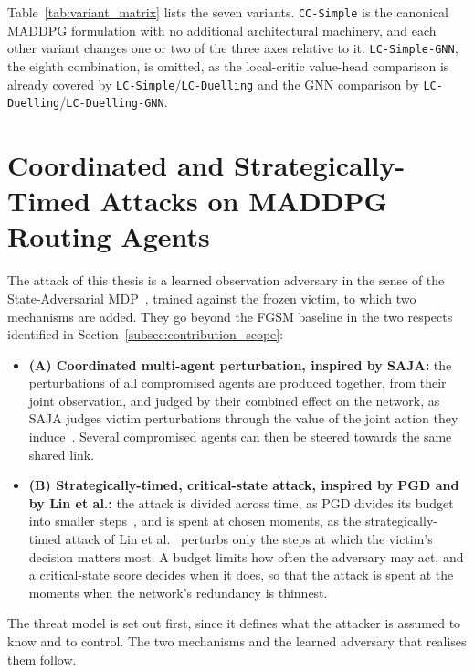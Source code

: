 Table~\ref{tab:variant_matrix} lists the seven variants. \texttt{CC-Simple} is the
canonical MADDPG formulation with no additional architectural machinery, and each other
variant changes one or two of the three axes relative to it. \texttt{LC-Simple-GNN},
the eighth combination, is omitted, as the local-critic value-head comparison is
already covered by \texttt{LC-Simple}/\texttt{LC-Duelling} and the GNN comparison by
\texttt{LC-Duelling}/\texttt{LC-Duelling-GNN}.

\section[Coordinated and Strategically-Timed Attacks on MADDPG Routing Agents][Coordinated and Strategically-Timed Attacks]{Coordinated and Strategically-Timed Attacks on MADDPG Routing Agents}
\label{subsec:pgd_maddpg}

The attack of this thesis is a learned observation adversary in the sense of the
State-Adversarial MDP~\cite{zhang2020robust}, trained against the frozen victim, to
which two mechanisms are added. They go beyond the FGSM baseline in the two respects
identified in Section~\ref{subsec:contribution_scope}:
\begin{itemize}
\item \textbf{(A) Coordinated multi-agent perturbation, inspired by SAJA:} the
perturbations of all compromised agents are produced together, from their joint
observation, and judged by their combined effect on the network, as SAJA judges victim
perturbations through the value of the joint action they
induce~\cite{guo2025sajastateactionjointattack}. Several compromised agents can then be
steered towards the same shared link.
\item \textbf{(B) Strategically-timed, critical-state attack, inspired by PGD and by Lin
et al.:} the attack is divided across time, as PGD divides its budget into smaller
steps~\cite{madry2019deeplearningmodelsresistant}, and is spent at chosen moments, as the
strategically-timed attack of Lin et
al.~\cite{lin2019tacticsadversarialattackdeep} perturbs only the steps at which the
victim's decision matters most. A budget limits how often the adversary may act, and a
critical-state score decides when it does, so that the attack is spent at the moments
when the network's redundancy is thinnest.
\end{itemize}

\noindent The threat model is set out first, since it defines what the attacker is
assumed to know and to control. The two mechanisms and the learned adversary that
realises them follow.


